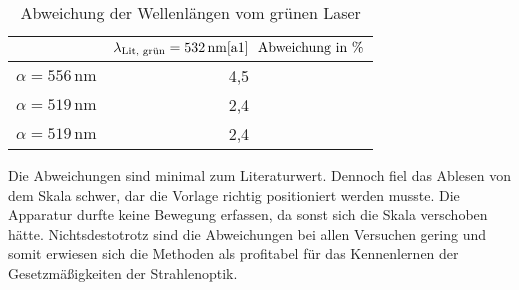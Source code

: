 \begin{table}[H]
    \centering
    \caption{Abweichung der Wellenlängen vom grünen Laser} 
    \label{Tabelle7}
    \begin{tabular} {c | c}
        \toprule
        {$ $} &
        {$ \lambda_\text{Lit, grün} = 532\,\unit{\nano\meter} \text{\cite{a1}} \,\,\,\, \text{Abweichung in \%} $} \\
        \midrule
        $\alpha = 556\,\unit{\nano\meter}$ & 4,5 \\
        $\alpha = 519\,\unit{\nano\meter}$ & 2,4 \\
        $\alpha = 519\,\unit{\nano\meter}$ & 2,4 \\
    \end{tabular} 
\end{table}

\begin{flushleft}
    Die Abweichungen sind minimal zum Literaturwert.
    Dennoch fiel das Ablesen von dem Skala schwer, dar die Vorlage richtig positioniert werden musste.
    Die Apparatur durfte keine Bewegung erfassen, da sonst sich die Skala verschoben hätte.
    Nichtsdestotrotz sind die Abweichungen bei allen Versuchen gering und somit erwiesen sich die Methoden als profitabel für das Kennenlernen der Gesetzmäßigkeiten der Strahlenoptik.
\end{flushleft}